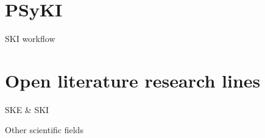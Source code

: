 \documentclass[presentation]{beamer}\mode<presentation>{\usetheme{AMSBolognaFC}}
\begin{document}
\section{PSyKI}


\begin{frame}[c]{SKI workflow}
\end{frame}


\section{Open literature research lines}


\begin{frame}[c]{SKE \& SKI}
\end{frame}


\begin{frame}[c]{Other scientific fields}
\end{frame}

\section*{}

\frame{\titlepage}

\section*{\refname}

\begin{frame}[c,noframenumbering]{\refname}
	\scriptsize
	
	
\end{frame}

\end{document}
